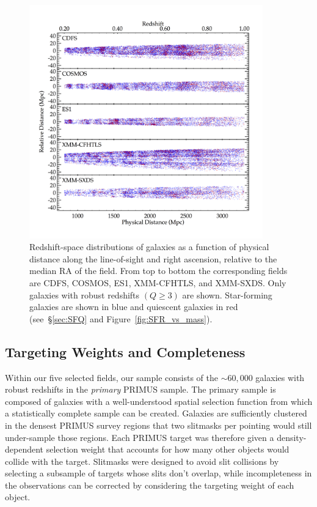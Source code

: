 \begin{figure}
  \centering
  \includegraphics[width=0.9\textwidth,natwidth=600,trim={0.2in 0.5in 0.4in 0.6in},clip]{figures/cone_diagrams.png}
  \caption{Redshift-space distributions of galaxies as a function of physical distance along the line-of-sight and right ascension, relative to the median RA of the field.
From top to bottom the corresponding fields are CDFS, COSMOS, ES1, XMM-CFHTLS, and XMM-SXDS.
Only galaxies with robust redshifts ${(Q \ge 3)}$ are shown.
Star-forming galaxies are shown in blue and quiescent galaxies in red (see~\S\ref{sec:SFQ} and Figure~\ref{fig:SFR_vs_mass}).
}
  \label{fig:cone_diagrams}
\end{figure}

\subsection{Targeting Weights and Completeness}\label{sec:targ_weight}
 
Within our five selected fields, our sample consists of the ${\sim 60,000}$ galaxies with robust redshifts in the \emph{primary} PRIMUS sample.
The primary sample is composed of galaxies with a well-understood spatial selection function from which a statistically complete sample can be created.
Galaxies are sufficiently clustered in the densest PRIMUS survey regions that two slitmasks per pointing would still under-sample those regions.
Each PRIMUS target was therefore given a density-dependent selection weight that accounts for how many other objects would collide with the target.
Slitmasks were designed to avoid slit collisions by selecting a subsample of targets whose slits don't overlap, while incompleteness in the observations can be corrected by considering the targeting weight of each object.

